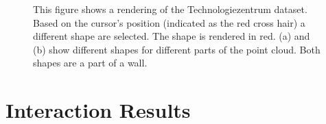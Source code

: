 \begin{figure}
\centering
{}
\caption[Two examples of user-guided shape detection]
{This figure shows a rendering of the Technologiezentrum dataset. Based on the cursor's position (indicated as the red cross hair) a different shape are selected. The shape is rendered in red. (a) and (b) show different shapes for different parts of the point cloud. Both shapes are a part of a wall.}
\label{fig:technologiezentrum_interactive_shape_detection}
\end{figure}


\section{Interaction Results}
\label{sec:interaction_results}

